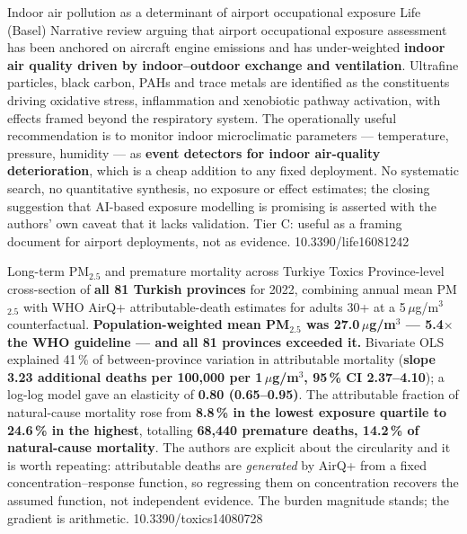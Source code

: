\documentclass[10pt]{article}
\begin{document}
{Indoor air pollution as a determinant of airport occupational exposure}
{Life (Basel)}
{Narrative review arguing that airport occupational exposure assessment has been anchored
on aircraft engine emissions and has under-weighted \textbf{indoor air quality driven by
indoor--outdoor exchange and ventilation}. Ultrafine particles, black carbon, PAHs and
trace metals are identified as the constituents driving oxidative stress, inflammation
and xenobiotic pathway activation, with effects framed beyond the respiratory system. The
operationally useful recommendation is to monitor indoor microclimatic parameters
--- temperature, pressure, humidity --- as \textbf{event detectors for indoor air-quality
deterioration}, which is a cheap addition to any fixed deployment. No systematic search,
no quantitative synthesis, no exposure or effect estimates; the closing suggestion that
AI-based exposure modelling is promising is asserted with the authors' own caveat that it
lacks validation. Tier C: useful as a framing document for airport deployments, not as
evidence.}
{10.3390/life16081242}


{Long-term PM$_{2.5}$ and premature mortality across Turkiye}
{Toxics}
{Province-level cross-section of \textbf{all 81 Turkish provinces} for 2022, combining
annual mean PM$_{2.5}$ with WHO AirQ+ attributable-death estimates for adults 30+ at a
5\,$\mu$g/m$^3$ counterfactual. \textbf{Population-weighted mean PM$_{2.5}$ was
27.0\,$\mu$g/m$^3$ --- 5.4$\times$ the WHO guideline --- and all 81 provinces exceeded
it.} Bivariate OLS explained 41\,\% of between-province variation in attributable
mortality (\textbf{slope 3.23 additional deaths per 100{,}000 per 1\,$\mu$g/m$^3$,
95\,\% CI 2.37--4.10}); a log-log model gave an elasticity of \textbf{0.80
(0.65--0.95)}. The attributable fraction of natural-cause mortality rose from
\textbf{8.8\,\% in the lowest exposure quartile to 24.6\,\% in the highest}, totalling
\textbf{68{,}440 premature deaths, 14.2\,\% of natural-cause mortality}. The authors are
explicit about the circularity and it is worth repeating: attributable deaths are
\emph{generated} by AirQ+ from a fixed concentration--response function, so regressing
them on concentration recovers the assumed function, not independent evidence. The
burden magnitude stands; the gradient is arithmetic.}
{10.3390/toxics14080728}
\end{document}
